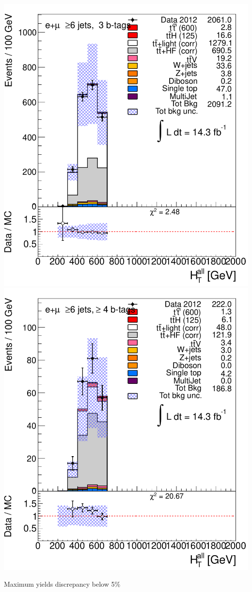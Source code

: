 \begin{frame}
{\includegraphics[width=.3\textwidth]{pics/htx_scaled/HTAll_ELEMUON_6jetin3btagex_NOMINAL.pdf}
\includegraphics[width=.3\textwidth]{pics/htx_scaled/HTAll_ELEMUON_6jetin4btagin_NOMINAL.pdf}
}

Maximum yields discrepancy below 5\%

\end{frame}


